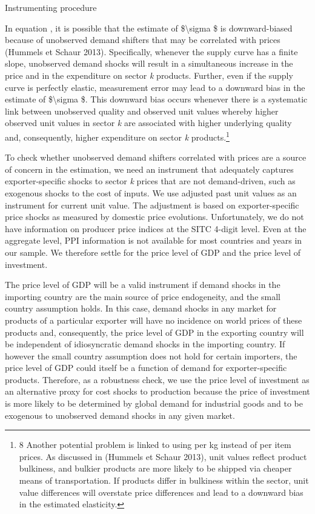 \documentclass[12pt,twoside,a4paper,notitlepage]{article}
\begin{document}
Instrumenting procedure

In equation {\hyperref[ref-002]{ }}, it is possible that the estimate of \$\textbackslash sigma \$ is downward-biased because of unobserved demand shifters that may be correlated with prices (Hummels et Schaur 2013). Specifically, whenever the supply curve has a finite slope, unobserved demand shocks will result in a simultaneous increase in the price and in the expenditure on sector \textit{k} products. Further, even if the supply curve is perfectly elastic, measurement error may lead to a downward bias in the estimate of \$\textbackslash sigma \$. This downward bias occurs whenever there is a systematic link between unobserved quality and observed unit values whereby higher observed unit values in sector \textit{k} are associated with higher underlying quality and, consequently, higher expenditure on sector \textit{k} products.\footnote{8 Another potential problem is linked to using per kg instead of per item prices. As discussed in (Hummels et Schaur 2013), unit values reflect product bulkiness, and bulkier products are more likely to be shipped via cheaper means of transportation. If products differ in bulkiness within the sector, unit value differences will overstate price differences and lead to a downward bias in the estimated elasticity.
} 

To check whether unobserved demand shifters correlated with prices are a source of concern in the estimation, we need an instrument that adequately captures exporter-specific shocks to sector \textit{k} prices that are not demand-driven, such as exogenous shocks to the cost of inputs. We use adjusted past unit values as an instrument for current unit value. The adjustment is based on exporter-specific price shocks as measured by domestic price evolutions. Unfortunately, we do not have information on producer price indices at the SITC 4-digit level. Even at the aggregate level, PPI information is not available for most countries and years in our sample. We therefore settle for the price level of GDP and the price level of investment.

The price level of GDP will be a valid instrument if demand shocks in the importing country are the main source of price endogeneity, and the small country assumption holds. In this case, demand shocks in any market for products of a particular exporter will have no incidence on world prices of these products and, consequently, the price level of GDP in the exporting country will be independent of idiosyncratic demand shocks in the importing country. If however the small country assumption does not hold for certain importers, the price level of GDP could itself be a function of demand for exporter-specific products. Therefore, as a robustness check, we use the price level of investment as an alternative proxy for cost shocks to production because the price of investment is more likely to be determined by global demand for industrial goods and to be exogenous to unobserved demand shocks in any given market. 
\end{document}
